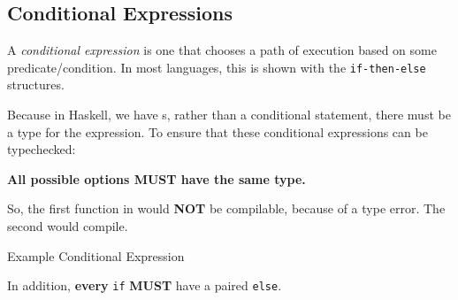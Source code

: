 \subsection{Conditional Expressions}\label{subsec:Conditional_Expressions}
\begin{definition}\label{def:Conditional_Expression}
  A \emph{conditional expression} is one that chooses a path of execution based on some predicate/condition.
  In most languages, this is shown with the \texttt{if-then-else} structures.
\end{definition}

Because in Haskell, we have s, rather than a conditional statement, there must be a type for the expression.
To ensure that these conditional expressions can be typechecked:
\begin{blackbox}
  \large{\textbf{All possible options MUST have the same type.}}
\end{blackbox}

So, the first function in  would \textbf{NOT} be compilable, because of a type error.
The second would compile.
\begin{listing}[h!tbp]
\caption{Example Conditional Expression}
\label{lst:Conditional_Expression}
\end{listing}

\begin{blackbox}
  In addition, \textbf{every} \texttt{if} \textbf{MUST} have a paired \texttt{else}.
\end{blackbox}

